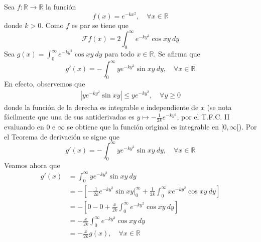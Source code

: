 \documentclass[12pt]{report}
\newcounter{it}
\theoremstyle{largebreak}
\renewcommand{\leq}{\ensuremath{\leqslant}}
\renewcommand{\geq}{\ensuremath{\geqslant}}
\newcommand\abs[1]{\ensuremath{\left|#1\right|}}
\newcommand\cf[3]{\ensuremath{#1:#2\rightarrow#3}}
\newcommand{\fou}[1]{\ensuremath{\mathcal{F}#1}}
\begin{document}
    \begin{exa}
        Sea $\cf{f}{\mathbb{R}}{\mathbb{R}}$ la función
        \begin{equation*}
            f(x)=e^{ -kx^2},\quad\forall x\in\mathbb{R}
        \end{equation*}
        donde $k>0$. Como $f$ es par se tiene que
        \begin{equation*}
            \fou{f}(x)=2\int_0^{\infty}e^{ -ky^2}\cos xy\:dy
        \end{equation*}
        Sea $g(x)=\int_0^\infty e^{ -ky^2}\cos xy\:dy$ para todo $x\in\mathbb{R}$. Se afirma que
        \begin{equation*}
            g'(x)=-\int_0^{\infty}ye^{ -ky^2}\sin xy\:dy,\quad\forall x\in\mathbb{R}
        \end{equation*}
        En efecto, observemos que
        \begin{equation*}
            \begin{split}
                \abs{ye^{-ky^2}\sin xy}\leq ye^{-ky^2},\quad\forall y\geq0
            \end{split}
        \end{equation*}
        donde la función de la derecha es integrable e independiente de $x$ (se nota fácilmente que una de sus antiderivadas es $y\mapsto-\frac{1}{2k}e^{ -ky^2}$, por el T.F.C. II evaluando en $0$ e $\infty$ se obtiene que la función original es integrable en $[0,\infty[$). Por el Teorema de derivación se sigue que
        \begin{equation*}
            g'(x)=-\int_0^{\infty}ye^{ -ky^2}\sin xy\:dy,\quad\forall x\in\mathbb{R}
        \end{equation*}
        Veamos ahora que
        \begin{equation*}
            \begin{split}
                g'(x)&=\int_0^{\infty}ye^{ -ky^2}\sin xy\:dy\\
                &=-\left[-\frac{1}{2k}e^{ -ky^2}\sin xy\Big|_0^{\infty}+\frac{1}{2k}\int_0^{\infty}xe^{ -ky^2}\cos xy\:dy \right]\\
                &=-\left[0-0+\frac{x}{2k}\int_0^{\infty}e^{ -ky^2}\cos xy\:dy \right]\\
                &=-\frac{x}{2k}\int_0^{\infty}e^{ -ky^2}\cos xy\:dy\\
                &=-\frac{x}{2k}g(x),\quad\forall x\in\mathbb{R} \\
            \end{split}
        \end{equation*}

\end{exa}
\end{document}
